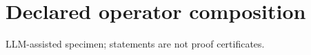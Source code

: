 \documentclass{article}
\begin{document}
\section*{Declared operator composition}
LLM-assisted specimen; statements are not proof certificates.

\end{document}
